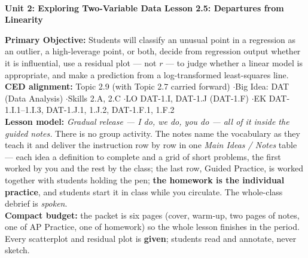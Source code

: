 \documentclass[10pt]{article}
\newcommand{\UnitNumberName}{Unit 2: Exploring Two-Variable Data \quad}
\newcommand{\LessonNumberName}{Lesson 2.5: Departures from Linearity}
\begin{document}
\begin{center}
    {\Large\bfseries \CourseName \\
    {\small\bfseries \UnitNumberName \LessonNumberName}}
\end{center}

\begin{tcolorbox}[colback=sky, colframe=navy, boxrule=0.9pt, arc=2mm,
    left=2mm, right=2mm, top=1.5mm, bottom=1.5mm]
    \textbf{Primary Objective:} Students will classify an unusual point in a regression as an
    outlier, a high-leverage point, or both, decide from regression output whether it is
    influential, use a residual plot --- not $r$ --- to judge whether a linear model is
    appropriate, and make a prediction from a log-transformed least-squares line.
    \\[2pt]
    \textbf{CED alignment:} Topic 2.9 (with Topic 2.7 carried forward) \quad$\cdot$\quad Big
    Idea: DAT (Data Analysis) \quad$\cdot$\quad Skills 2.A, 2.C \quad$\cdot$\quad LO DAT-1.I,
    DAT-1.J (DAT-1.F) \quad$\cdot$\quad EK DAT-1.I.1--1.I.3, DAT-1.J.1, 1.J.2, DAT-1.F.1, 1.F.2
    \\[2pt]
    \textbf{Lesson model:} \emph{Gradual release --- I do, we do, you do --- all of it inside
    the guided notes.} There is no group activity. The notes name the vocabulary as they teach
    it and deliver the instruction row by row in one \emph{Main Ideas / Notes} table --- each
    idea a definition to complete and a grid of short problems, the first worked by you and the
    rest by the class; the last row, Guided Practice, is worked together with students holding
    the pen; \textbf{the homework is the individual practice}, and students start it in class
    while you circulate. The whole-class debrief is \emph{spoken}.
    \\[2pt]
    \textbf{Compact budget:} the packet is six pages (cover, warm-up, two pages of notes, one
    of AP Practice, one of homework) so the whole lesson finishes in the period. Every
    scatterplot and residual plot is \textbf{given}; students read and annotate, never sketch.
\end{tcolorbox}
\end{document}
